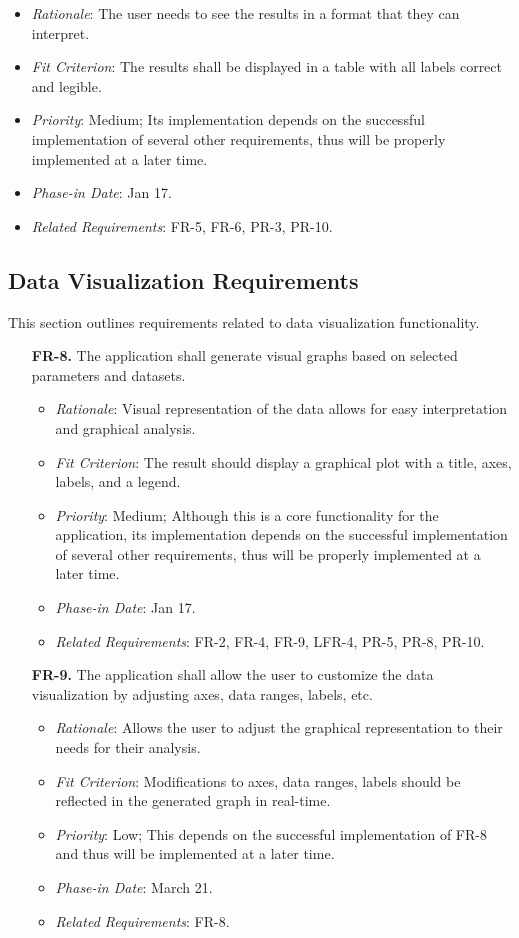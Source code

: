 \documentclass[12pt]{article}
\begin{document}
\begin{enumerate}
\begin{itemize}
    \item \textit{Rationale}: The user needs to see the results in a format that they can interpret.
    \item \textit{Fit Criterion}: The results shall be displayed in a table with all labels correct and legible.
    \item \textit{Priority}: Medium; Its implementation depends on the successful implementation of several other requirements, thus will be properly implemented at a later time.
    \item \textit{Phase-in Date}: Jan 17.
    \item \textit{Related Requirements}: FR-5, FR-6, PR-3, PR-10.
  \end{itemize}
\end{enumerate}

\subsection{Data Visualization Requirements}
This section outlines requirements related to data visualization functionality.
\begin{enumerate}
  \item[\textbf{FR-8.}] The application shall generate visual graphs based on selected parameters and datasets.
  \begin{itemize}
    \item \textit{Rationale}: Visual representation of the data allows for easy interpretation and graphical analysis.
    \item \textit{Fit Criterion}: The result should display a graphical plot with a title, axes, labels, and a legend.
    \item \textit{Priority}: Medium; Although this is a core functionality for the application, its implementation depends on the successful implementation of several other requirements, thus will be properly implemented at a later time.
    \item \textit{Phase-in Date}: Jan 17.
    \item \textit{Related Requirements}: FR-2, FR-4, FR-9, LFR-4, PR-5, PR-8, PR-10.
  \end{itemize}
  \item[\textbf{FR-9.}] The application shall allow the user to customize the data visualization by adjusting axes, data ranges, labels, etc.
  \begin{itemize}
    \item \textit{Rationale}: Allows the user to adjust the graphical representation to their needs for their analysis.
    \item \textit{Fit Criterion}: Modifications to axes, data ranges, labels should be reflected in the generated graph in real-time.
    \item \textit{Priority}: Low; This depends on the successful implementation of FR-8 and thus will be implemented at a later time.
    \item \textit{Phase-in Date}: March 21.
    \item \textit{Related Requirements}: FR-8.
  \end{itemize}
\end{enumerate}
\end{document}
